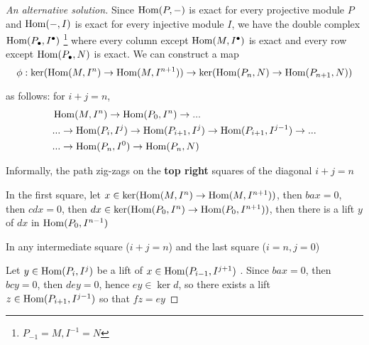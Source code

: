 \begin{proof}[An alternative solution]
	
	Since $\operatorname{Hom}(P, -)$ is exact for every projective module $P$ and $\operatorname{Hom}(-, I)$ is exact for every injective module $I$, we have the double complex $\operatorname{Hom}(P_\bullet, I^\bullet)$ \footnote{$P_{-1} = M, I^{-1} = N$} where every column except $\operatorname{Hom}(M, I^\bullet)$ is exact and every row except $\operatorname{Hom}(P_\bullet, N)$ is exact. We can construct a map 
	$$
		\phi: \ker (\operatorname{Hom}(M, I^n) \to \operatorname{Hom}(M, I^{n+1})) \to \ker (\operatorname{Hom}(P_n, N) \to \operatorname{Hom}(P_{n+1}, N))
	$$
	
	as follows: for $i + j = n$,
	\begin{align*}
		&\operatorname{Hom}(M, I^n) \to \operatorname{Hom}(P_0, I^n) \to ... \\
		&... \to \operatorname{Hom}(P_i, I^j) \to \operatorname{Hom}(P_{i+1}, I^j) \to \operatorname{Hom}(P_{i+1}, I^{j-1}) \to ... \\
		&... \to \operatorname{Hom}(P_n, I^0) \to \operatorname{Hom}(P_n, N)
	\end{align*}
	
	Informally, the path zig-zags on the \textbf{top right} squares of the diagonal $i + j = n$
	
	In the first square, let $x \in \ker (\operatorname{Hom}(M, I^n) \to \operatorname{Hom}(M, I^{n+1}))$, then $bax = 0$, then $cdx = 0$, then $dx \in \ker (\operatorname{Hom}(P_0, I^n) \to \operatorname{Hom}(P_0, I^{n+1}))$, then there is a lift $y$ of $dx$ in $\operatorname{Hom}(P_0, I^{n-1})$
	\begin{center}
	\end{center}
	
	In any intermediate square ($i + j = n$) and the last square ($i=n, j = 0$)
	\begin{center}
	\end{center}
	Let $y \in \operatorname{Hom}(P_i, I^j)$ be a lift of $x \in \operatorname{Hom}(P_{i-1}, I^{j+1})$ . Since $bax = 0$, then $bcy = 0$, then $dey = 0$, hence $ey \in \ker d$, so there exists a lift $z \in \operatorname{Hom}(P_{i+1}, I^{j-1})$ so that $fz = ey$
	

\end{proof}
